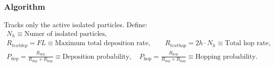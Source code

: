 \documentclass[letterpaper]{article}
\begin{document}
    \subsubsection{Algorithm}
    
    Tracks only the active isolated particles. Define:
    \begin{gather*}
        N_{h}\equiv\text{Numer of isolated particles},\\
        R_{text{dep}}=FL\equiv\text{Maximum total deposition rate},\qquad
        R_{text{hop}}=2h\cdot N_{h}\equiv\text{Total hop rate},\\
        P_{\text{dep}} = \frac{R_{\text{dep}}}{R_{\text{dep}}+R_{\text{hop}}}
        \equiv{\text{Deposition probability}},
        \quad
        P_{\text{hop}} = \frac{R_{\text{hop}}}{R_{\text{dep}}+R_{\text{hop}}}
        \equiv{\text{Hopping probability}}.
    \end{gather*}
\end{document}
